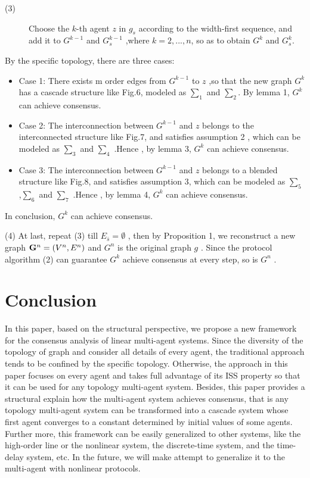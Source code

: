 \documentclass[english]{cccconf}
\begin{document}
{{\begin{description}
  \item[(3)]Choose the $k$-th agent  $z$ in $g_s$  according to the width-first sequence, and  add it to   $G_{}^{k-1}$ and $G_{s}^{k-1}$  ,where $k = 2,...,n$, so as to obtain $G_{}^{k}$ and $G_{s}^{k}$.
  \end{description}
By the specific topology, there are three cases:
\begin{itemize}
  \item Case 1:  There exists m order edges from   $G_{}^{k-1}$ to $z$ ,so that the new graph $G^k$ has a cascade structure  like Fig.6, modeled as  $\sum_1$ and $\sum_2$. By lemma 1, $G^k$ can achieve consensus.
\end{itemize}

\begin{itemize}
  \item Case 2:  The interconnection between $G^{k-1}$  and $z$  belongs to the
interconnected structure like Fig.7, and satisfies assumption 2 , which can be modeled as $\sum_3$  and $\sum_4$ .Hence , by lemma 3, $G^k$ can achieve consensus.
\end{itemize}

\begin{itemize}
  \item Case 3:  The interconnection between   $G^{k-1}$  and $z$   belongs to
a blended structure like Fig.8, and satisfies assumption 3, which can be modeled as $\sum_5$  ,$\sum_6$  and $\sum_7$ .Hence , by lemma 4,  $G^k$ can achieve consensus.
\end{itemize}

 In conclusion,  $G^k$  can achieve consensus.

(4)	At last, repeat  (3)  till ${E_{\bar s}} = \emptyset $ , then by Proposition 1,
we reconstruct a new graph ${{\bf{G}}^n} = ({V^n},{E^n})$  and $G^n$  is the original graph $g$ . Since  the protocol algorithm (2) can guarantee $G^k$  achieve consensus at every step, so is $G^n$  .


\section{Conclusion}

In this paper, based on the structural perspective, we propose a new framework for the consensus analysis of linear multi-agent systems.  Since the diversity of the topology of graph and consider all details of every agent,
the traditional approach tends to be confined by the specific topology. Otherwise, the approach in this paper focuses on every agent and takes full advantage of its ISS property so that it can be used for any topology multi-agent system. Besides, this paper provides a structural explain  how the multi-agent system achieves consensus, that is any topology multi-agent system can be transformed into a cascade system whose  first agent converges to a constant determined by initial values of some agents. Further more, this framework can be easily generalized to other  systems, like the high-order line or the nonlinear system, the discrete-time system, and the time-delay system, etc. In the future, we will make attempt to generalize it to the multi-agent with nonlinear protocols.

}}
\end{document}
